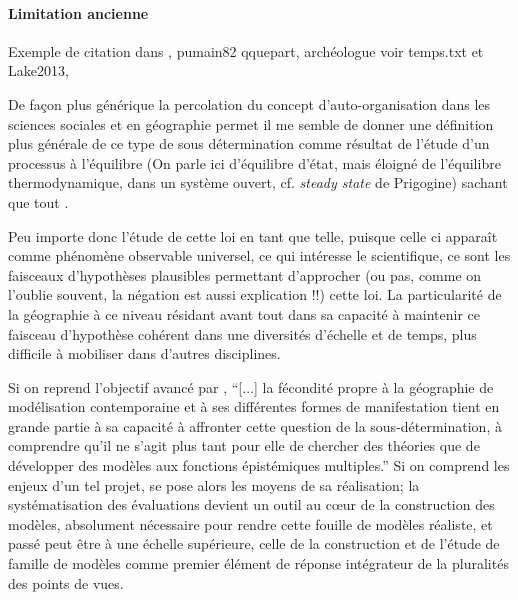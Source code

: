 \paragraph{Limitation ancienne}
Exemple de citation dans \textcite[192]{Sheps1971}, pumain82 qquepart, archéologue voir temps.txt et Lake2013, 

De façon plus générique la percolation du concept d'auto-organisation dans les sciences sociales et en géographie permet il me semble de donner une définition plus générale de ce type de sous détermination comme résultat de l'étude d'un processus à l'équilibre (On parle ici d'équilibre d'état, mais éloigné de l'équilibre thermodynamique, dans un système ouvert, cf. \textit{steady state} de Prigogine) sachant que tout . 

Peu importe donc l'étude de cette loi en tant que telle, puisque celle ci apparaît comme phénomène observable universel, ce qui intéresse le scientifique, ce sont les faisceaux d'hypothèses plausibles permettant d'approcher (ou pas, comme on l'oublie souvent, la négation est aussi explication !!) cette loi. La particularité de la géographie à ce niveau résidant avant tout dans sa capacité à maintenir ce faisceau d'hypothèse cohérent dans une diversités d'échelle et de temps, plus difficile à mobiliser dans d'autres disciplines.

Si on reprend l'objectif avancé par \autocite{Varenne2014}, \enquote{[...] la fécondité propre à la géographie de modélisation contemporaine et à ses différentes formes de manifestation tient en grande partie à sa capacité à affronter cette question de la sous-détermination, à comprendre qu’il ne s’agit plus tant pour elle de chercher des théories que de développer des modèles aux fonctions épistémiques multiples.} Si on comprend les enjeux d'un tel projet, se pose alors les moyens de sa réalisation; la systématisation des évaluations devient un outil au cœur de la construction des modèles, absolument nécessaire pour rendre cette fouille de modèles réaliste, et passé peut être à une échelle supérieure, celle de la construction et de l'étude de famille de modèles comme premier élément de réponse intégrateur de la pluralités des points de vues.

